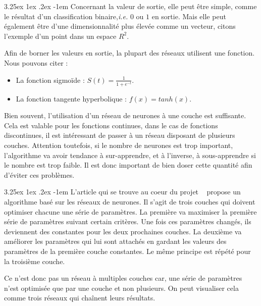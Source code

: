 \documentclass[a4paper, 11pt]{article}
\makeatletter
\renewcommand\paragraph{\@startsection{paragraph}{5}{\z@}%
  {3.25ex \@plus1ex \@minus.2ex}%
  {-1em}%
  {\normalfont\normalsize\bfseries}}
\makeatother
\begin{document}

\paragraph{}
Concernant la valeur de sortie, elle peut être simple, comme le résultat d'un classification binaire,\textit{i.e.} $0$ ou $1$ en sortie. Mais elle peut également être d'une dimensionnalité plus élevée comme un vecteur, citons l'exemple d'un point dans un espace $R^2$.

Afin de borner les valeurs en sortie, la plupart des réseaux utilisent une fonction. Nous pouvons citer :
\begin{itemize}
\item La fonction sigmoïde : $S(t) = \frac{1}{1 + e^{-t}}$.
\item La fonction tangente hyperbolique : $f(x) = tanh(x)$.
\end{itemize}

Bien souvent, l'utilisation d'un réseau de neurones à une couche est suffisante. Cela est valable pour les fonctions continues, dans le cas de fonctions discontinues, il est intéressant de passer à un réseau disposant de plusieurs couches. Attention toutefois, si le nombre de neurones est trop important, l'algorithme va avoir tendance à sur-apprendre, et à l'inverse, à sous-apprendre si le nombre est trop faible. Il est donc important de bien doser cette quantité afin d'éviter ces problèmes.

\paragraph{}
L'article qui se trouve au coeur du projet ~\cite{fx_trading} propose un algorithme basé sur les réseaux de neurones. Il s'agit de trois couches qui doivent optimiser chacune une série de paramètres. La première va maximiser la première série de paramètres suivant certain critères. Une fois ces paramètres changés, ils deviennent des constantes pour les deux prochaines couches. La deuxième va améliorer les paramètres qui lui sont attachés en gardant les valeurs des paramètres de la première couche constantes. Le même principe est répété pour la troisième couche.

Ce n'est donc pas un réseau à multiples couches car, une série de paramètres n'est optimisée que par une couche et non plusieurs. On peut visualiser cela comme trois réseaux qui chaînent leurs résultats.
\end{document}
